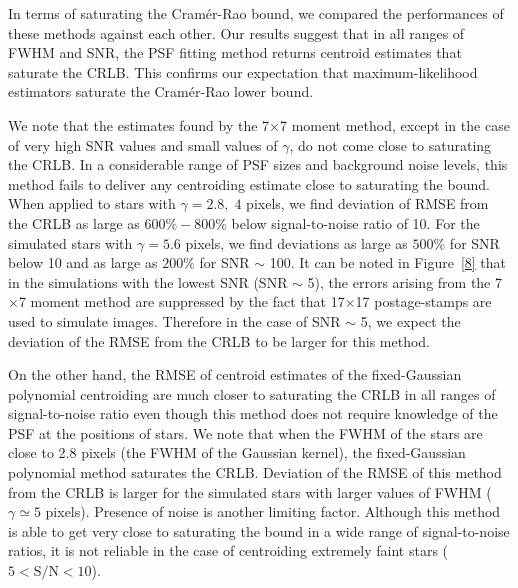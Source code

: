 \documentclass[onecolumn]{aastex61}
\newcommand{\todo}[1]{{\textcolor{dred}{ #1}}}
\begin{document}
\todo{In terms of saturating the Cram\'{e}r-Rao bound, we compared the performances of these methods against each other. Our results suggest that in all ranges of FWHM and SNR, the PSF fitting method returns 
centroid estimates that saturate the CRLB. This confirms our expectation that maximum-likelihood estimators saturate the Cram\'{e}r-Rao lower bound.} 

\todo{We note that the estimates found by the 7$\times$7 moment method, except in the case of
very high SNR values and small values of $\gamma$, do not come close to
saturating the CRLB. In a considerable range of PSF sizes and background noise levels, 
this method fails to deliver any centroiding estimate close to saturating the bound. When applied to stars with $\gamma = 2.8, \; 4$ pixels, we find deviation of RMSE from the CRLB as large as $600\%-800\%$ below signal-to-noise ratio of 10. For the simulated stars with $\gamma = 5.6$ pixels, we find deviations as large as $500 \%$ for SNR below 10 and as large as $200 \%$ for SNR $\sim$ 100. It can be noted in Figure~\ref{8} that in the simulations with the lowest SNR (SNR $\sim$ 5), the errors arising from the 7$\times$7 moment method are suppressed by the fact that 17$\times$17 postage-stamps are used to simulate images. Therefore in the case of SNR $\sim$ 5, we expect the deviation of the RMSE from the CRLB to be larger for this method.}

\todo{On the other hand, the RMSE of centroid estimates of the fixed-Gaussian polynomial centroiding are much closer to saturating the CRLB in all ranges of signal-to-noise ratio even though this method does not require knowledge of the PSF at the positions of stars. We note that when the FWHM of the stars are close to 2.8 pixels (the FWHM of the Gaussian kernel), the fixed-Gaussian polynomial method saturates the CRLB. Deviation of the RMSE of this method from the CRLB is larger for the simulated stars with larger values of FWHM ($\gamma \simeq 5$ pixels). Presence of noise is another limiting factor.
Although this method is able to get very close to saturating the bound in a wide range of
signal-to-noise ratios, it is not reliable in the case of centroiding extremely faint stars ($5<\mathrm{S/N}<10$).}

\end{document}
